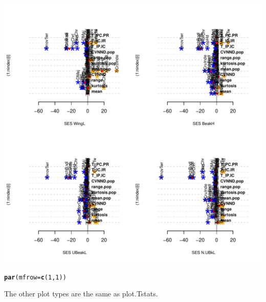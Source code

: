 \documentclass[12pt]{article}\usepackage[]{graphicx}\usepackage[]{color}
\makeatletter
\def\maxwidth{ %
  \ifdim\Gin@nat@width>\linewidth
    \linewidth
  \else
    \Gin@nat@width
  \fi
}
\newcommand{\hlnum}[1]{\textcolor[rgb]{0.686,0.059,0.569}{#1}}%
\newcommand{\hlstd}[1]{\textcolor[rgb]{0.345,0.345,0.345}{#1}}%
\newcommand{\hlkwc}[1]{\textcolor[rgb]{0.333,0.667,0.333}{#1}}%
\newcommand{\hlkwd}[1]{\textcolor[rgb]{0.737,0.353,0.396}{\textbf{#1}}}%
\newenvironment{kframe}{%
 \def\at@end@of@kframe{}%
 \ifinner\ifhmode%
  \def\at@end@of@kframe{\end{minipage}}%
  \begin{minipage}{\columnwidth}%
 \fi\fi%
 \def\FrameCommand##1{\hskip\@totalleftmargin \hskip-\fboxsep
 \colorbox{shadecolor}{##1}\hskip-\fboxsep
     \hskip-\linewidth \hskip-\@totalleftmargin \hskip\columnwidth}%
 \MakeFramed {\advance\hsize-\width
   \@totalleftmargin\z@ \linewidth\hsize
   \@setminipage}}%
 {\par\unskip\endMakeFramed%
 \at@end@of@kframe}
\newenvironment{knitrout}{}{} %
\makeatother
\begin{document}
\begin{knitrout}
\includegraphics[width=\maxwidth]{figure/unnamed-chunk-51-2} 
\begin{kframe}\begin{alltt}
\hlkwd{par}\hlstd{(}\hlkwc{mfrow} \hlstd{=} \hlkwd{c}\hlstd{(}\hlnum{1}\hlstd{,}\hlnum{1}\hlstd{))}
\end{alltt}
\end{kframe}
\end{knitrout}

The other plot types are the same as plot.Tstats.
\end{document}
